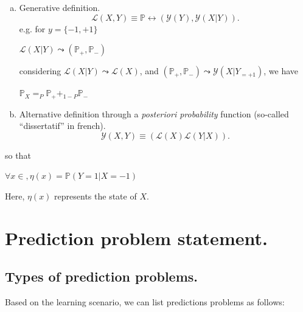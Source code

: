 			\begin{enumerate}[a)] %
				\item Generative definition.
					\begin{equation}
						\mathcal{L}(X,Y) \equiv \mathbb{P} \leftrightarrow (\mathcal{Y}(Y), \mathcal{Y}(X|Y)).
						\label{p_generative_law_example}
					\end{equation}
				e.g. for $y=\{-1,+1\}$\\ 
				\centerline{$\mathcal{L}(X|Y) \leadsto (\mathbb{P}_{+},\mathbb{P}_{-})$}

				considering $\mathcal{L}(X|Y) \leadsto \mathcal{L}(X)$, and $(\mathbb{P}_{+},\mathbb{P}_{-}) \leadsto \mathcal{Y}(X|Y_{=+1})$, we have\\ 
				\centerline{$\mathbb{P}_X = _{P}\mathbb{P}_{+} + _{1-P}\mathbb{P}_{-}$}


				\item Alternative definition through a \emph{posteriori probability} function \cite{tc_Lugosi} (so-called ``dissertatif'' in french).
					\begin{equation}
						\mathcal{Y}(X,Y) \equiv (\mathcal{L}(X)\mathcal{L}(Y|X)).
						\label{p_generative_law_example}
					\end{equation}
			\end{enumerate}
			so that\\
			\centerline{$\forall x \in, \eta(x)=\mathbb{P}(Y=1|X=-1)$}
			Here, $\eta(x)$ represents the state of $X$.
		


	\section{Prediction problem statement.}
		
		\subsection{Types of prediction problems.}
			Based on the learning scenario, we can list predictions problems as follows:
	
